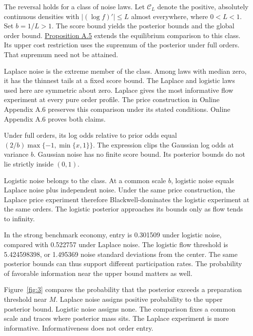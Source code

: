 
The reversal holds for a class of noise laws.
Let \(\mathcal C_L\) denote the positive, absolutely continuous densities
with \(|(\log f)'|\le L\) almost everywhere, where \(0<L<1\).
Set \(b=1/L>1\).
The score bound yields the posterior bounds and the global order bound.
\hyperref[result-proposition-a-5]{Proposition A.5} extends the equilibrium
comparison to this class.
Its upper cost restriction uses the supremum of the posterior under full orders.
That supremum need not be attained.

Laplace noise is the extreme member of the class.
Among laws with median zero, it has the thinnest tails at a fixed score bound.
The Laplace and logistic laws used here are symmetric about zero.
Laplace gives the most informative flow experiment at every pure order profile.
The price construction in Online Appendix A.6 preserves this comparison under its stated conditions.
Online Appendix A.6 proves both claims.
\par
Under full orders, its log odds relative to prior odds equal
\((2/b)\max\{-1,\min\{x,1\}\}\).
The expression clips the Gaussian log odds at variance \(b\).
Gaussian noise has no finite score bound.
Its posterior bounds do not lie strictly inside \((0,1)\).

Logistic noise belongs to the class.
At a common scale \(b\), logistic noise equals Laplace noise plus independent noise.
Under the same price construction, the Laplace price experiment therefore Blackwell-dominates the logistic experiment at the same orders.
The logistic posterior approaches its bounds only as flow tends to infinity.
\par
In the strong benchmark economy, entry is 0.301509 under logistic noise,
compared with 0.522757 under Laplace noise.
The logistic flow threshold is 5.424598398, or 1.495369 noise standard deviations from the center.
The same posterior bounds can thus support different participation rates.
The probability of favorable information near the upper bound matters as well.

Figure~\ref{fig:3} compares the probability that the posterior exceeds
a preparation threshold near \(M\).
Laplace noise assigns positive probability to the upper posterior bound.
Logistic noise assigns none.
The comparison fixes a common scale and traces where posterior mass sits.
The Laplace experiment is more informative.
Informativeness does not order entry.
